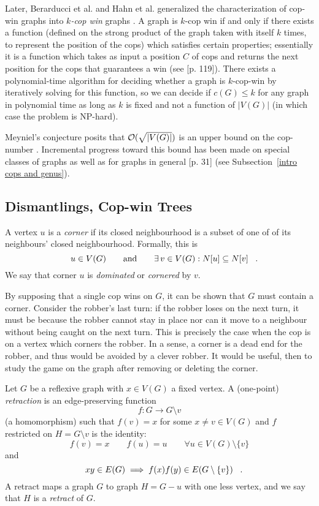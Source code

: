 Later, Berarducci et al. and Hahn et al. generalized the characterization of cop-win graphs
into \textit{$k$-cop win} graphs \cite{berarducci1993cop, hahn2003characterisation}. A graph is $k$-cop win if and only if there exists a function (defined on the strong product of the graph taken with itself $k$ times, to represent the position of the cops) which satisfies certain properties; essentially it is a function which takes as input a position $C$ of cops and returns the next position for the cops that guarantees a win (see \cite{bonato2011game}[p. 119]).
There exists a polynomial-time algorithm for deciding whether a graph is $k$-cop-win by iteratively
solving for this function, so we can decide if $c(G) \leq k$ for any graph in polynomial time as long as $k$ is fixed and not a function of $\lvert V(G) \rvert$ (in which case the problem is NP-hard).

Meyniel's conjecture posits that $\mathcal{O}(\sqrt{\lvert V(G)\rvert })$ is an upper bound on the cop-number \cite{frankl1987cops}.
Incremental progress toward this bound has been made on special classes of graphs as well as for graphs in general  \cite{gera2016graph}[p. 31] (see Subsection~\ref{intro cops and genus}).

\subsection{Dismantlings, Cop-win Trees \label{intro dismantlings}}

A vertex $u$ is a \textit{corner} if its closed neighbourhood
is a subset of one of of its neighbours' closed neighbourhood. Formally, this is
\[u \in V(G) \qquad \text{and} \qquad \exists \, v\in V(G) : N[u] \subseteq N[v] \mperiod \]
We say that corner $u$ is \textit{dominated} or \textit{cornered} by $v$.

By supposing that a single cop wins on $G$, it can be shown that $G$ must contain a corner. Consider the robber's last turn: if the robber loses on the next turn, it must be because the robber cannot stay in place nor can it move to a neighbour without being caught on the next turn. This is precisely the case when the cop is on a vertex which corners the robber. In a sense, a corner is a dead end for the robber, and thus would be avoided by a clever robber. It would be useful, then to study the game on the graph after removing or deleting the corner.

Let $G$ be a reflexive graph with $x\in V(G)$ a fixed vertex. A (one-point) \textit{retraction} is an edge-preserving function
\[f : G \rightarrow G \setminus v \]
(a homomorphism) such that $f(v) = x$ for some $x \neq v \in V(G)$ and $f$ restricted on $H = G \setminus v$ is the identity:
\[ f(v) = x \qquad f(u) = u \qquad \forall u \in V(G)\setminus \{ v \} \]
and
\[ xy \in E(G) \implies f(x)f(y) \in E(G \setminus \{ v \}) \mperiod \]
A retract maps a graph $G$ to graph $H = G - u$ with one less vertex, and we say that $H$ is a \textit{retract} of $G$.

